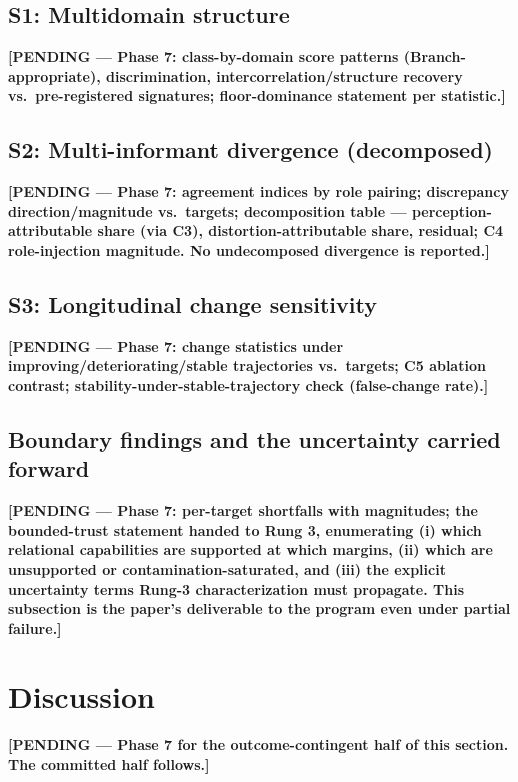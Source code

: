 \documentclass[12pt, letterpaper]{article}
\newcommand{\pending}[1]{\textcolor{blue!55!black}{\textbf{[PENDING --- #1]}}}
\begin{document}
\subsection{S1: Multidomain structure}
\pending{Phase 7: class-by-domain score patterns (Branch-appropriate), discrimination, intercorrelation/structure recovery vs.\ pre-registered signatures; floor-dominance statement per statistic.}

\subsection{S2: Multi-informant divergence (decomposed)}
\pending{Phase 7: agreement indices by role pairing; discrepancy direction/magnitude vs.\ targets; decomposition table --- perception-attributable share (via C3), distortion-attributable share, residual; C4 role-injection magnitude. No undecomposed divergence is reported.}

\subsection{S3: Longitudinal change sensitivity}
\pending{Phase 7: change statistics under improving/deteriorating/stable trajectories vs.\ targets; C5 ablation contrast; stability-under-stable-trajectory check (false-change rate).}

\subsection{Boundary findings and the uncertainty carried forward}
\pending{Phase 7: per-target shortfalls with magnitudes; the bounded-trust statement handed to Rung 3, enumerating (i) which relational capabilities are supported at which margins, (ii) which are unsupported or contamination-saturated, and (iii) the explicit uncertainty terms Rung-3 characterization must propagate. This subsection is the paper's deliverable to the program even under partial failure.}

\section{Discussion}
\label{sec:discussion}

\pending{Phase 7 for the outcome-contingent half of this section. The committed half follows.}
\end{document}

